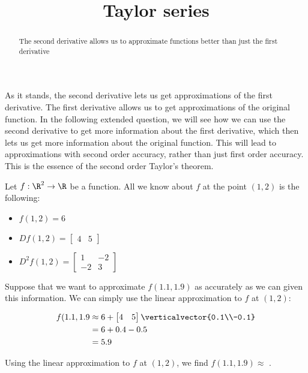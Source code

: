 \documentclass{ximera}
\title{Taylor series}
\begin{document}
\begin{abstract}
  The second derivative allows us to approximate functions better than just the first derivative
\end{abstract}

As it stands, the second derivative lets us get approximations of the first derivative.  The first derivative allows us to get approximations of the original function.
In the following extended question, we will see how we can use the second derivative to get more information about the first derivative, which then lets us get more
information about the original function.  This will lead to approximations with second order accuracy, rather than just first order accuracy.  This is the essence of 
the second order Taylor's theorem.

\begin{question}
  Let $f:\R^2 \to \R$ be a function.  All we know about $f$ at the point $(1,2)$ is the following:
  \begin{itemize}
  \item $f(1,2) = 6$
  \item \(Df(1,2) = \begin{bmatrix} 4 & 5 \end{bmatrix}\)
  \item \( D^2f(1,2)  = \begin{bmatrix} 1 & -2 \\ -2 & 3\end{bmatrix}\)
  \end{itemize} 
  
  Suppose that we want to approximate $f(1.1,1.9)$ as accurately as we can given this information.
  We can simply use the linear approximation to $f$ at $(1,2)$:
  
  \begin{solution}
    \begin{hint}
      \begin{align*}
        f(1.1,1.9 &\approx 6+\begin{bmatrix} 4 & 5 \end{bmatrix} \verticalvector{0.1\\-0.1}\\
        &=6+0.4-0.5\\
        &=5.9
      \end{align*}
    \end{hint}
    Using the linear approximation to $f$ at $(1,2)$, we find $f(1.1,1.9) \approx$ .
  \end{solution}
  

\end{question}
\end{document}
